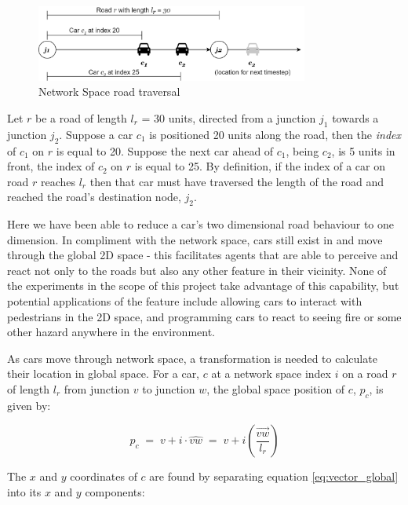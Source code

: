 \vspace{1cm}
\begin{figure}[ht]
    \centering
    \includegraphics[width=0.8\textwidth]{images/network_space.png}
    \caption{Network Space road traversal}
    \label{fig:network_space}
\end{figure}
\vspace{1cm}
Let $r$ be a road of length $l_r$ = 30 units, directed from a junction $j_1$ towards a junction $j_2$. Suppose a car $c_1$ is positioned 20 units along the road, then the \textit{index} of $c_1$ on $r$ is equal to 20. Suppose the next car ahead of $c_1$, being $c_2$, is 5 units in front, the index of $c_2$ on $r$ is equal to 25. By definition, if the index of a car on road $r$ reaches $l_r$ then that car must have traversed the length of the road and reached the road's destination node, $j_2$.

Here we have been able to reduce a car's two dimensional road behaviour to one dimension. In compliment with the network space, cars still exist in and move through the global 2D space - this facilitates agents that are able to perceive and react not only to the roads but also any other feature in their vicinity. None of the experiments in the scope of this project take advantage of this capability, but potential applications of the feature include allowing cars to interact with pedestrians in the 2D space, and programming cars to react to seeing fire or some other hazard anywhere in the environment. 

As cars move through network space, a transformation is needed to calculate their location in global space. For a car, $c$ at a network space index $i$ on a road $r$ of length $l_r$ from junction $v$ to junction $w$, the global space position of $c$, $p_c$, is given by:

\begin{equation}
    p_c \;=\; v + i\cdot\hat{vw} \;=\; v + i(\frac{\vec{vw}}{l_r})
    \label{eq:vector_global}
\end{equation}

The $x$ and $y$ coordinates of $c$ are found by separating equation \ref{eq:vector_global} into its $x$ and $y$ components:

